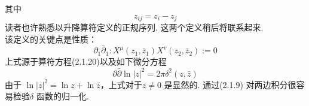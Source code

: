 其中
\begin{equation}
z_{i j}=z_{i}-z_{j}
\end{equation}
读者也许熟悉以升降算符定义的正规序列. 这两个定义稍后将联系起来. \\
该定义的关键点是性质：
\begin{equation}
\partial_{1} \bar{\partial}_{1}: X^{\mu}\left(z_{1}, \bar{z}_{1}\right) X^{v}\left(z_{2}, \bar{z}_{2}\right):=0
\end{equation}
上式源于算符方程(2.1.20)以及如下微分方程
\begin{equation}
\partial \bar{\partial} \ln |z|^{2}=2 \pi \delta^{2}(z, \bar{z})
\end{equation}
由于 $\ln |z|^{2}=\ln z+\ln \bar{z}$，上式对于$z \neq 0$ 是显然的. 通过(2.1.9) 对两边积分很容易检验$\delta$ 函数的归一化.

